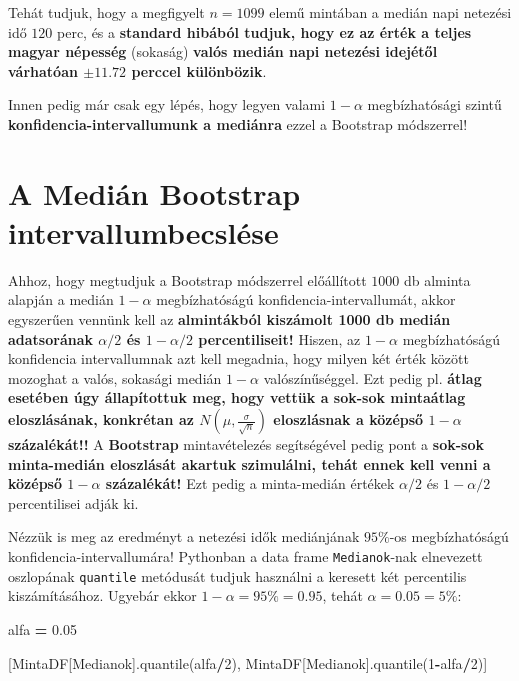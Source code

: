 \documentclass[
]{book}
\newenvironment{Shaded}{\begin{snugshade}}{\end{snugshade}}
\newcommand{\DecValTok}[1]{\textcolor[rgb]{0.00,0.00,0.81}{#1}}
\newcommand{\FloatTok}[1]{\textcolor[rgb]{0.00,0.00,0.81}{#1}}
\newcommand{\NormalTok}[1]{#1}
\newcommand{\OperatorTok}[1]{\textcolor[rgb]{0.81,0.36,0.00}{\textbf{#1}}}
\newcommand{\StringTok}[1]{\textcolor[rgb]{0.31,0.60,0.02}{#1}}
\begin{document}
Tehát tudjuk, hogy a megfigyelt \(n=1099\) elemű mintában a medián napi netezési idő \(120\) perc, és a \textbf{standard hibából tudjuk, hogy ez az érték a teljes magyar népesség} (sokaság) \textbf{valós medián napi netezési idejétől várhatóan \(\pm11.72\) perccel különbözik}.

Innen pedig már csak egy lépés, hogy legyen valami \(1-\alpha\) megbízhatósági szintű \textbf{konfidencia-intervallumunk a mediánra} ezzel a Bootstrap módszerrel!

\section{A Medián Bootstrap intervallumbecslése}\label{a-mediuxe1n-bootstrap-intervallumbecsluxe9se}

Ahhoz, hogy megtudjuk a Bootstrap módszerrel előállított \(1000\) db alminta alapján a medián \(1-\alpha\) megbízhatóságú konfidencia-intervallumát, akkor egyszerűen vennünk kell az \textbf{almintákból kiszámolt 1000 db medián adatsorának \(\alpha/2\) és \(1-\alpha/2\) percentiliseit!}
Hiszen, az \(1-\alpha\) megbízhatóságú konfidencia intervallumnak azt kell megadnia, hogy milyen két érték között mozoghat a valós, sokasági medián \(1-\alpha\) valószínűséggel. Ezt pedig pl. \textbf{átlag esetében úgy állapítottuk meg, hogy vettük a sok-sok mintaátlag eloszlásának, konkrétan az \(N\left(\mu, \frac{\sigma}{\sqrt{n}}\right)\) eloszlásnak a középső \(1-\alpha\) százalékát!!}
A \textbf{Bootstrap} mintavételezés segítségével pedig pont a \textbf{sok-sok minta-medián eloszlását akartuk szimulálni, tehát ennek kell venni a középső \(1-\alpha\) százalékát!} Ezt pedig a minta-medián értékek \(\alpha/2\) és \(1-\alpha/2\) percentilisei adják ki.

Nézzük is meg az eredményt a netezési idők mediánjának \(95\%\)-os megbízhatóságú konfidencia-intervallumára! Pythonban a data frame \texttt{Medianok}-nak elnevezett oszlopának \texttt{quantile} metódusát tudjuk használni a keresett két percentilis kiszámításához.
Ugyebár ekkor \(1-\alpha=95\%=0.95\), tehát \(\alpha=0.05=5\%\):

\begin{Shaded}
\begin{Highlighting}[]
\NormalTok{alfa }\OperatorTok{=} \FloatTok{0.05}

\NormalTok{[MintaDF[}\StringTok{\textquotesingle{}Medianok\textquotesingle{}}\NormalTok{].quantile(alfa}\OperatorTok{/}\DecValTok{2}\NormalTok{), MintaDF[}\StringTok{\textquotesingle{}Medianok\textquotesingle{}}\NormalTok{].quantile(}\DecValTok{1}\OperatorTok{{-}}\NormalTok{alfa}\OperatorTok{/}\DecValTok{2}\NormalTok{)]}
\end{Highlighting}
\end{Shaded}
\end{document}
